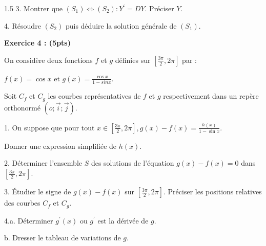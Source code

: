 \documentclass[12pt]{article}
\begin{document}
\begin{spacing}{1.5}
3. Montrer que $(S_1)\Longleftrightarrow(S_2):Y^{\prime} = DY$. Préciser $Y$.

4. Résoudre $(S_2)$ puis déduire la solution générale de $(S_1)$.

\textbf{Exercice 4 : (5pts)}

On considère deux fonctions $f$ et $g$ définies sur $[\frac{3\pi}{2},2\pi]$ par :

$f(x) = \cos x$ et $g(x)=\frac{\cos x}{1 - sin x}$.

Soit $C_f$ et $C_g$ les courbes représentatives de $f$ et $g$ respectivement dans un repère orthonormé $(o;\overrightarrow{i};\overrightarrow{j})$.

1. On suppose que pour tout $x\in [\frac{3\pi}{2},2\pi], g(x) - f(x) = \frac{h(x)}{1-\sin x}$.

Donner une expression simplifiée de $h(x)$.

2. Déterminer l'ensemble $S$ des solutions de l'équation $g(x)-f(x)=0$ dans $[\frac{3\pi}{2},2\pi]$.

3. Étudier le signe de $g(x)-f(x)$ sur $[\frac{3\pi}{2},2\pi]$. Préciser les positions relatives des courbes $C_f$ et $C_g$.

4.a. Déterminer $g^{\prime}(x)$ ou $g^{\prime}$ est la dérivée de $g$.

b. Dresser le tableau de variations de $g$.












\newpage

\end{spacing}
\end{document}
